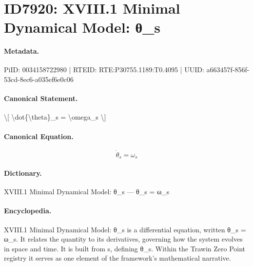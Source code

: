 \section*{ID7920: XVIII.1 Minimal Dynamical Model: θ\_s}
\paragraph{Metadata.}
PiID: 0034158722980 | RTEID: RTE:P30755.1189:T0.4095 | UUID: a663457f-856f-53cd-8ec6-a035ef6e0c06

\paragraph{Canonical Statement.}
\textbackslash{}[ \textbackslash{}dot\{\textbackslash{}theta\}\_s = \textbackslash{}omega\_s \textbackslash{}]

\paragraph{Canonical Equation.}
\[
\dot{\theta}_s = \omega_s
\]

\paragraph{Dictionary.}
XVIII.1 Minimal Dynamical Model: θ\_s — θ\_s = ω\_s

\paragraph{Encyclopedia.}
XVIII.1 Minimal Dynamical Model: θ\_s is a differential equation, written θ\_s = ω\_s. It relates the quantity to its derivatives, governing how the system evolves in space and time. It is built from s, defining θ\_s. Within the Trawin Zero Point registry it serves as one element of the framework's mathematical narrative.
